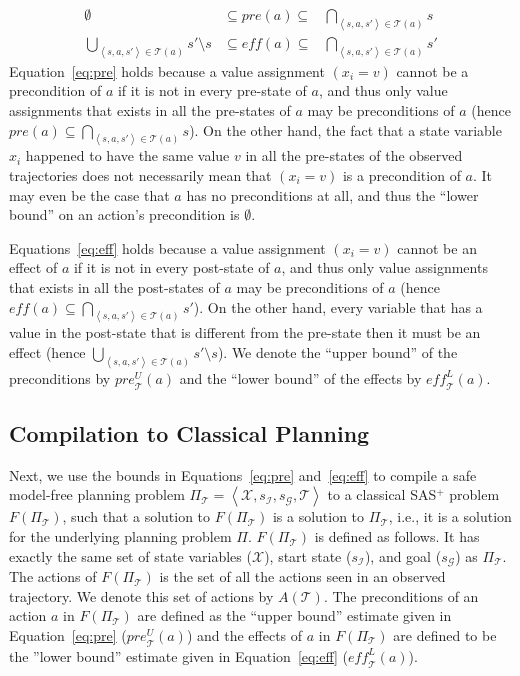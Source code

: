 \documentclass{article}
\newcommand{\tuple}[1]{\ensuremath{\left \langle #1 \right \rangle }}
\newcommand{\SAS}{SAS$^+$}
\newcommand{\cmfp}{safe model-free planning}
\newcommand{\eff}{\textit{eff}}
\newcommand{\pre}{\textit{pre}}
\begin{document}
	\begin{align}
	\emptyset & \subseteq \pre(a) \subseteq & \bigcap_{\tuple{s, a, s'}\in \mathcal{T}(a)} s \label{eq:pre} \\
	\bigcup_{\tuple{s, a, s'}\in \mathcal{T}(a)} s'\setminus s &
	\subseteq \eff(a) \subseteq &
	\bigcap_{\tuple{s, a, s'}\in \mathcal{T}(a)} s'
	\label{eq:eff}
	\end{align}
	Equation~\ref{eq:pre} holds because a value assignment $(x_i=v)$ cannot be a precondition of $a$ if it is not in every pre-state of $a$, and thus only value assignments that 
	exists in all the pre-states of $a$ may be preconditions of $a$ (hence $\pre(a)\subseteq \bigcap_{\tuple{s, a, s'}\in \mathcal{T}(a)} s$).     On the other hand, the fact that a state variable $x_i$ happened to have the same value $v$ in all the pre-states of the observed trajectories does not necessarily mean that $(x_i=v)$ is a precondition of $a$. It may even be the case that $a$ has no preconditions at all, and thus the ``lower bound'' on an action's precondition is $\emptyset$. 
	
	Equations~\ref{eq:eff} holds because a value assignment $(x_i=v)$ cannot be an effect of $a$ if it is not in every post-state of $a$, and thus only value assignments that 
	exists in all the post-states of $a$ may be preconditions of $a$ (hence $\eff(a)\subseteq \bigcap_{\tuple{s, a, s'}\in \mathcal{T}(a)} s'$). On the other hand, every variable that has a value in the post-state that is different from the pre-state then it must be an effect (hence $\bigcup_{\tuple{s, a, s'}\in \mathcal{T}(a)} s'\setminus s$).
	We denote the ``upper bound'' of the preconditions by $\pre_\mathcal{T}^U(a)$ 
	and the ``lower bound'' of the effects by $\eff_\mathcal{T}^L(a)$. 
	
	
	
	\subsection{Compilation to Classical Planning} 
	Next, we use the bounds in Equations~\ref{eq:pre} and~\ref{eq:eff} to compile a \cmfp{} problem 
	$\Pi_\mathcal{T}=\tuple{\mathcal{X},s_\mathcal{I}, s_\mathcal{G}, \mathcal{T}}$ 
	to a classical \SAS{} problem $F(\Pi_\mathcal{T})$, such that a solution to $F(\Pi_\mathcal{T})$ 
	is a solution to $\Pi_\mathcal{T}$, i.e., it is a solution for the underlying planning problem $\Pi$. 
	$F(\Pi_\mathcal{T})$ is defined as follows. It has exactly the same set of 
	state variables ($\mathcal{X}$), start state ($s_\mathcal{I}$), and goal ($s_\mathcal{G}$) as $\Pi_\mathcal{T}$. The actions of $F(\Pi_\mathcal{T})$ is the set of all the actions seen in an observed trajectory. We denote this set of actions by $A(\mathcal{T})$. 
	The preconditions of an action $a$ in  $F(\Pi_\mathcal{T})$ 
	are defined as the ``upper bound'' estimate given in Equation~\ref{eq:pre} ($\pre_\mathcal{T}^U(a)$) and the effects of $a$ in  $F(\Pi_\mathcal{T})$  
	are defined to be the ''lower bound'' estimate given in 
	Equation~\ref{eq:eff} ($\eff_\mathcal{T}^L(a)$).
	
\end{document}
